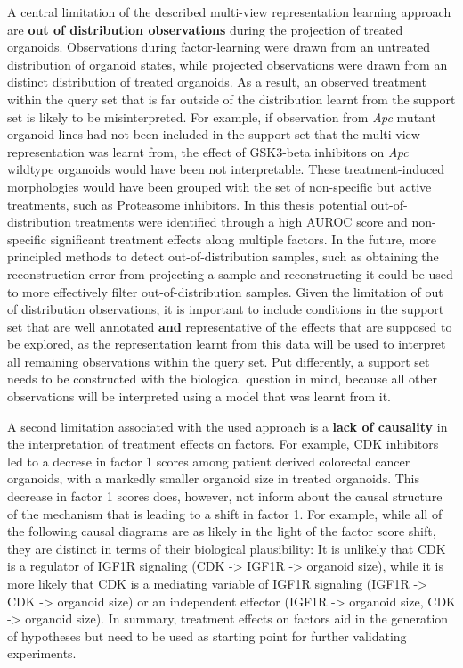 \begin{flushleft}
A central limitation of the described multi-view representation learning approach are \textbf{out of distribution observations} during the projection of treated organoids. Observations during factor-learning were drawn from an untreated distribution of organoid states, while projected observations were drawn from an distinct distribution of treated organoids. As a result, an observed treatment within the query set that is far outside of the distribution learnt from the support set is likely to be misinterpreted. For example, if observation from \textit{Apc} mutant organoid lines had not been included in the support set that the multi-view representation was learnt from, the effect of GSK3-beta inhibitors on \textit{Apc} wildtype organoids would have been not interpretable. These treatment-induced morphologies would have been grouped with the set of non-specific but active treatments, such as Proteasome inhibitors. In this thesis potential out-of-distribution treatments were identified through a high AUROC score and non-specific significant treatment effects along multiple factors. In the future, more principled methods to detect out-of-distribution samples, such as obtaining the reconstruction error from projecting a sample and reconstructing it could be used to more effectively filter out-of-distribution samples. Given the limitation of out of distribution observations, it is important to include conditions in the support set that are well annotated \textbf{and} representative of the effects that are supposed to be explored, as the representation learnt from this data will be used to interpret all remaining observations within the query set. Put differently, a support set needs to be constructed with the biological question in mind, because all other observations will be interpreted using a model that was learnt from it.
\par

A second limitation associated with the used approach is a \textbf{lack of causality} in the interpretation of treatment effects on factors. For example, CDK inhibitors led to a decrese in factor 1 scores among patient derived colorectal cancer organoids, with a markedly smaller organoid size in treated organoids. This decrease in factor 1 scores does, however, not inform about the causal structure of the mechanism that is leading to a shift in factor 1. For example, while all of the following causal diagrams are as likely in the light of the factor score shift, they are distinct in terms of their biological plausibility: It is unlikely that CDK is a regulator of IGF1R signaling (CDK -> IGF1R -> organoid size), while it is more likely that CDK is a mediating variable of IGF1R signaling (IGF1R -> CDK -> organoid size) or an independent effector (IGF1R -> organoid size, CDK -> organoid size). In summary, treatment effects on factors aid in the generation of hypotheses but need to be used as starting point for further validating experiments.
\par


\end{flushleft}
